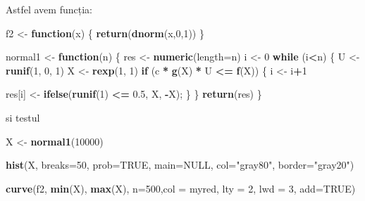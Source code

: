 \documentclass[]{article}
\newenvironment{Shaded}{\begin{snugshade}}{\end{snugshade}}
\newcommand{\ControlFlowTok}[1]{\textcolor[rgb]{0.13,0.29,0.53}{\textbf{#1}}}
\newcommand{\DataTypeTok}[1]{\textcolor[rgb]{0.13,0.29,0.53}{#1}}
\newcommand{\DecValTok}[1]{\textcolor[rgb]{0.00,0.00,0.81}{#1}}
\newcommand{\FloatTok}[1]{\textcolor[rgb]{0.00,0.00,0.81}{#1}}
\newcommand{\KeywordTok}[1]{\textcolor[rgb]{0.13,0.29,0.53}{\textbf{#1}}}
\newcommand{\NormalTok}[1]{#1}
\newcommand{\OperatorTok}[1]{\textcolor[rgb]{0.81,0.36,0.00}{\textbf{#1}}}
\newcommand{\OtherTok}[1]{\textcolor[rgb]{0.56,0.35,0.01}{#1}}
\newcommand{\StringTok}[1]{\textcolor[rgb]{0.31,0.60,0.02}{#1}}
\begin{document}
Astfel avem funcția:

\begin{Shaded}
\begin{Highlighting}[]
\NormalTok{f2 <-}\StringTok{ }\ControlFlowTok{function}\NormalTok{(x) \{}
  \KeywordTok{return}\NormalTok{(}\KeywordTok{dnorm}\NormalTok{(x,}\DecValTok{0}\NormalTok{,}\DecValTok{1}\NormalTok{))}
\NormalTok{\}}

\NormalTok{normal1 <-}\StringTok{ }\ControlFlowTok{function}\NormalTok{(n) \{}
\NormalTok{  res <-}\StringTok{ }\KeywordTok{numeric}\NormalTok{(}\DataTypeTok{length=}\NormalTok{n)}
\NormalTok{  i <-}\StringTok{ }\DecValTok{0}
  \ControlFlowTok{while}\NormalTok{ (i}\OperatorTok{<}\NormalTok{n) \{}
\NormalTok{    U <-}\StringTok{ }\KeywordTok{runif}\NormalTok{(}\DecValTok{1}\NormalTok{, }\DecValTok{0}\NormalTok{, }\DecValTok{1}\NormalTok{)}
\NormalTok{    X <-}\StringTok{ }\KeywordTok{rexp}\NormalTok{(}\DecValTok{1}\NormalTok{, }\DecValTok{1}\NormalTok{)}
    \ControlFlowTok{if}\NormalTok{ (c }\OperatorTok{*}\StringTok{ }\KeywordTok{g}\NormalTok{(X) }\OperatorTok{*}\StringTok{ }\NormalTok{U }\OperatorTok{<=}\StringTok{ }\KeywordTok{f}\NormalTok{(X)) \{}
\NormalTok{      i <-}\StringTok{ }\NormalTok{i}\OperatorTok{+}\DecValTok{1}
      
\NormalTok{      res[i] <-}\StringTok{ }\KeywordTok{ifelse}\NormalTok{(}\KeywordTok{runif}\NormalTok{(}\DecValTok{1}\NormalTok{) }\OperatorTok{<=}\StringTok{ }\FloatTok{0.5}\NormalTok{, X, }\OperatorTok{-}\NormalTok{X);}
\NormalTok{    \}}
\NormalTok{  \}}
  \KeywordTok{return}\NormalTok{(res)}
\NormalTok{\}}
\end{Highlighting}
\end{Shaded}

si testul

\begin{Shaded}
\begin{Highlighting}[]
\NormalTok{X <-}\StringTok{ }\KeywordTok{normal1}\NormalTok{(}\DecValTok{10000}\NormalTok{)}

\KeywordTok{hist}\NormalTok{(X, }\DataTypeTok{breaks=}\DecValTok{50}\NormalTok{, }
     \DataTypeTok{prob=}\OtherTok{TRUE}\NormalTok{, }
     \DataTypeTok{main=}\OtherTok{NULL}\NormalTok{, }
     \DataTypeTok{col=}\StringTok{"gray80"}\NormalTok{, }\DataTypeTok{border=}\StringTok{"gray20"}\NormalTok{)}

\KeywordTok{curve}\NormalTok{(f2, }\KeywordTok{min}\NormalTok{(X), }\KeywordTok{max}\NormalTok{(X), }\DataTypeTok{n=}\DecValTok{500}\NormalTok{,}\DataTypeTok{col =}\NormalTok{ myred, }\DataTypeTok{lty =} \DecValTok{2}\NormalTok{, }\DataTypeTok{lwd =} \DecValTok{3}\NormalTok{, }\DataTypeTok{add=}\OtherTok{TRUE}\NormalTok{)}
\end{Highlighting}
\end{Shaded}
\end{document}
